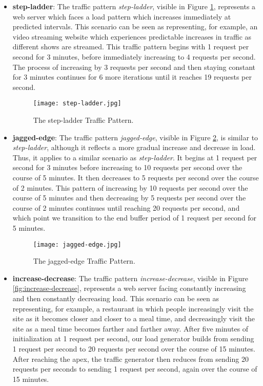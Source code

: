 \begin{itemize}
  \item \textbf{step-ladder}: The traffic pattern \textit{step-ladder}, visible
    in Figure \ref{fig:step-ladder}, represents a web server which faces a load
    pattern which increases immediately at predicted intervals. This scenario
    can be seen as representing, for example, an video streaming website which
    experiences predictable increases in traffic as different shows are
    streamed. This traffic pattern begins with 1 request per second for 3
    minutes, before immediately increasing to 4 requests per second. The process
    of increasing by 3 requests per second and then staying constant for 3
    minutes continues for 6 more iterations until it reaches 19 requests per
    second.

    \begin{figure}[!h]
      \centerline{\texttt{[image: step-ladder.jpg]}}
      \caption{The step-ladder Traffic Pattern.}
      \label{fig:step-ladder}
    \end{figure}

  \item \textbf{jagged-edge}: The traffic pattern \textit{jagged-edge}, visible
    in Figure \ref{fig:jagged-edge}, is similar to \textit{step-ladder},
    although it reflects a more gradual increase and decrease in load. Thus, it
    applies to a similar scenario as \textit{step-ladder}. It begins at 1
    request per second for 3 minutes before increasing to 10 requests per
    second over the course of 5 minutes. It then decreases to 5 requests per
    second over the course of 2 minutes. This pattern of increasing by 10
    requests per second over the course of 5 minutes and then decreasing by 5
    requests per second over the course of 2 minutes continues until reaching 20
    requests per second, and which point we transition to the end buffer period
    of 1 request per second for 5 minutes.

    \begin{figure}[!h]
      \centerline{\texttt{[image: jagged-edge.jpg]}}
      \caption{The jagged-edge Traffic Pattern.}
      \label{fig:jagged-edge}
    \end{figure}

  \item \textbf{increase-decrease}: The traffic pattern
    \textit{increase-decrease}, visible in Figure \ref{fig:increase-decrease},
    represents a web server facing constantly increasing and then constantly
    decreasing load. This scenario can be seen as representing, for example, a
    restaurant in which people increasingly visit the site as it becomes closer
    and closer to a meal time, and decreasingly visit the site as a meal time
    becomes farther and farther away. After five minutes of initialization at
    1 request per second, our load
    generator builds from sending 1 request per second to 20 requests per
    second over the course of 15 minutes. After reaching the apex, the traffic
    generator then reduces from sending 20 requests per seconds to sending 1
    request per second, again over the course of 15 minutes.


\end{itemize}
